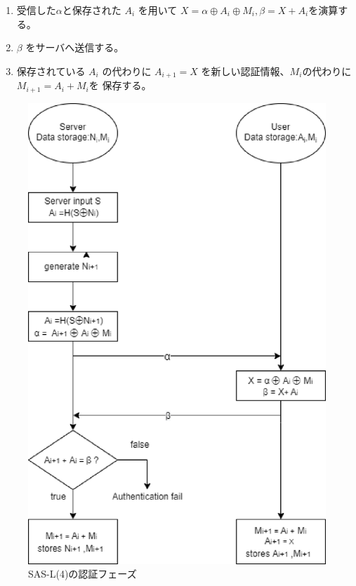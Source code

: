\documentclass{thesis}
\begin{document}
\begin{enumerate}[1.]
				\item 受信した$\alpha$と保存された $A_i$ を用いて $X = \alpha \oplus A_i \oplus M_i , \beta =X+A_i$を演算する。
				\item $\beta$ をサーバへ送信する。
				\item 保存されている $A_i$ の代わりに $A_{i+1}=X$ を新しい認証情報、$M_i$の代わりに$M_{i+1}=A_{i}+M_{i}$を
				保存する。
\end{enumerate}
%
\begin{figure}[H]
 \center
 \includegraphics[scale=0.75]{./image/sasl4i.eps}
 \caption{SAS-L(4)の認証フェーズ}
 \label{4i}
\end{figure}
%
\end{document}
